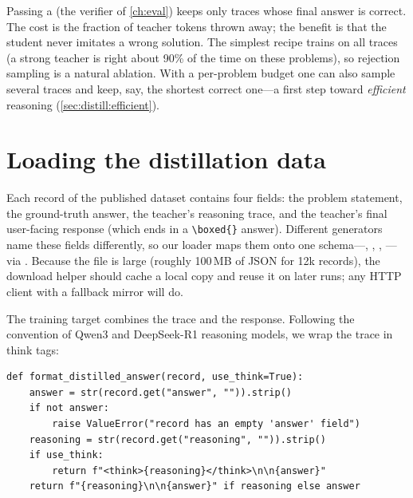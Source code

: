 \begin{systemslens}
Passing a  (the verifier of \cref{ch:eval}) keeps only traces whose final
answer is correct. The cost is the fraction of teacher tokens thrown away; the benefit is that
the student never imitates a wrong solution. The simplest recipe trains on all traces
(a strong teacher is right about 90\% of the time on these problems), so rejection sampling is a
natural ablation. With a per-problem budget one can also sample several traces and keep, say,
the shortest correct one---a first step toward \emph{efficient} reasoning
(\cref{sec:distill:efficient}).
\end{systemslens}

\section{Loading the distillation data}\label{sec:distill:load}

Each record of the published dataset contains four fields: the problem statement, the
ground-truth answer, the teacher's reasoning trace, and the teacher's final user-facing
response (which ends in a \texttt{\textbackslash boxed\{\}} answer). Different generators name these fields
differently, so our loader maps them onto one schema---, ,
, ---via . Because the file is large
(roughly 100\,MB of JSON for 12k records), the download helper should cache a local copy and
reuse it on later runs; any HTTP client with a fallback mirror will do.

The training target combines the trace and the response. Following the convention of Qwen3
and DeepSeek-R1 reasoning models, we wrap the trace in think tags:

\begin{lstlisting}[caption={Turning a teacher record into the student's target text.},
label={lst:distill:format}]
def format_distilled_answer(record, use_think=True):
    answer = str(record.get("answer", "")).strip()
    if not answer:
        raise ValueError("record has an empty 'answer' field")
    reasoning = str(record.get("reasoning", "")).strip()
    if use_think:
        return f"<think>{reasoning}</think>\n\n{answer}"
    return f"{reasoning}\n\n{answer}" if reasoning else answer
\end{lstlisting}

